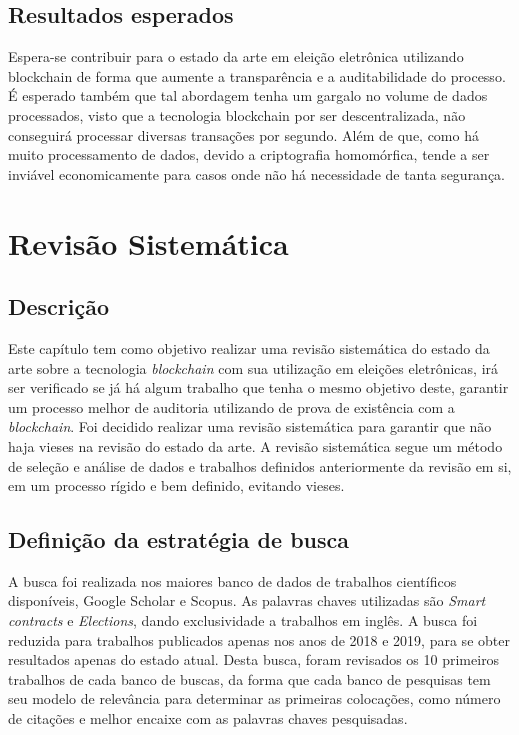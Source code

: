 \documentclass{ufsctex/ufsctex}
\begin{document}
\section{Resultados esperados}

Espera-se contribuir para o estado da arte em eleição eletrônica utilizando
blockchain de forma que aumente a transparência e a auditabilidade do processo.
É esperado também que tal abordagem tenha um gargalo no volume de dados
processados, visto que a tecnologia blockchain por ser descentralizada, não
conseguirá processar diversas transações por segundo. Além de que, como há muito
processamento de dados, devido a criptografia homomórfica, tende a ser inviável
economicamente para casos onde não há necessidade de tanta segurança.

\chapter{Revisão Sistemática}

\section{Descrição}

Este capítulo tem como objetivo realizar uma revisão sistemática do estado da
arte sobre a tecnologia \textit{blockchain} com sua utilização em eleições
eletrônicas, irá ser verificado se já há algum trabalho que tenha o mesmo
objetivo deste, garantir um processo melhor de auditoria utilizando de prova de
existência com a \textit{blockchain}. Foi decidido realizar uma revisão
sistemática para garantir que não haja vieses na revisão do estado da arte. A
revisão sistemática segue um método de seleção e análise de dados e trabalhos
definidos anteriormente da revisão em si, em um processo rígido e bem definido,
evitando vieses.

\section{Definição da estratégia de busca}

A busca foi realizada nos maiores banco de dados de trabalhos científicos
disponíveis, Google Scholar e Scopus. As palavras chaves utilizadas são
\textit{Smart contracts} e \textit{Elections}, dando exclusividade a trabalhos
em inglês. A busca foi reduzida para trabalhos publicados apenas nos anos de
2018 e 2019, para se obter resultados apenas do estado atual. Desta busca,
foram revisados os 10 primeiros trabalhos de cada banco de buscas, da forma que
cada banco de pesquisas tem seu modelo de relevância para determinar as
primeiras colocações, como número de citações e melhor encaixe com as palavras
chaves pesquisadas.
\end{document}
